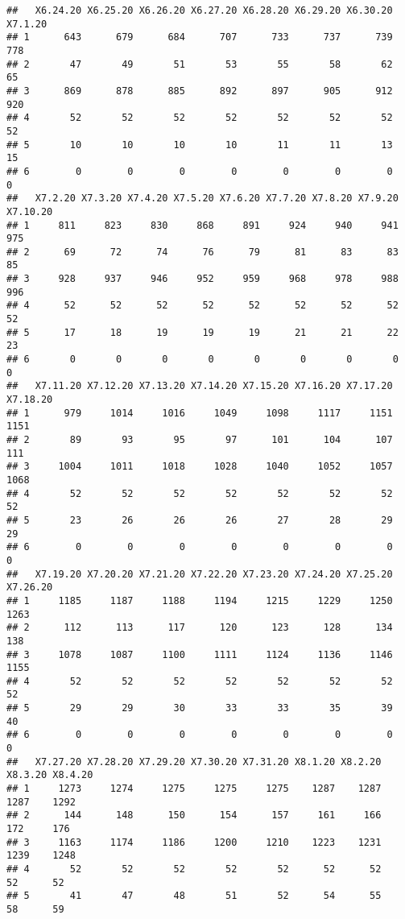 \documentclass[
]{article}
\begin{document}
\begin{verbatim}
##   X6.24.20 X6.25.20 X6.26.20 X6.27.20 X6.28.20 X6.29.20 X6.30.20 X7.1.20
## 1      643      679      684      707      733      737      739     778
## 2       47       49       51       53       55       58       62      65
## 3      869      878      885      892      897      905      912     920
## 4       52       52       52       52       52       52       52      52
## 5       10       10       10       10       11       11       13      15
## 6        0        0        0        0        0        0        0       0
##   X7.2.20 X7.3.20 X7.4.20 X7.5.20 X7.6.20 X7.7.20 X7.8.20 X7.9.20 X7.10.20
## 1     811     823     830     868     891     924     940     941      975
## 2      69      72      74      76      79      81      83      83       85
## 3     928     937     946     952     959     968     978     988      996
## 4      52      52      52      52      52      52      52      52       52
## 5      17      18      19      19      19      21      21      22       23
## 6       0       0       0       0       0       0       0       0        0
##   X7.11.20 X7.12.20 X7.13.20 X7.14.20 X7.15.20 X7.16.20 X7.17.20 X7.18.20
## 1      979     1014     1016     1049     1098     1117     1151     1151
## 2       89       93       95       97      101      104      107      111
## 3     1004     1011     1018     1028     1040     1052     1057     1068
## 4       52       52       52       52       52       52       52       52
## 5       23       26       26       26       27       28       29       29
## 6        0        0        0        0        0        0        0        0
##   X7.19.20 X7.20.20 X7.21.20 X7.22.20 X7.23.20 X7.24.20 X7.25.20 X7.26.20
## 1     1185     1187     1188     1194     1215     1229     1250     1263
## 2      112      113      117      120      123      128      134      138
## 3     1078     1087     1100     1111     1124     1136     1146     1155
## 4       52       52       52       52       52       52       52       52
## 5       29       29       30       33       33       35       39       40
## 6        0        0        0        0        0        0        0        0
##   X7.27.20 X7.28.20 X7.29.20 X7.30.20 X7.31.20 X8.1.20 X8.2.20 X8.3.20 X8.4.20
## 1     1273     1274     1275     1275     1275    1287    1287    1287    1292
## 2      144      148      150      154      157     161     166     172     176
## 3     1163     1174     1186     1200     1210    1223    1231    1239    1248
## 4       52       52       52       52       52      52      52      52      52
## 5       41       47       48       51       52      54      55      58      59

\end{verbatim}
\end{document}
